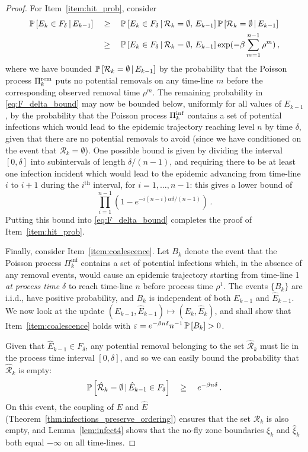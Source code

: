 \documentclass[]{article}
\newcommand{\Epidemic}{E}%
\newcommand{\Removals}{\mathcal{R}}
\newcommand{\Poisson}{\Pi}
\newcommand{\early}[1]{#1}
\newcommand{\late}[1]{\hat{#1}}
\newcommand{\PoissonRem}{\Poisson^\textup{rem}}
\newcommand{\PoissonInf}{\Poisson^\textup{inf}}
\begin{document}
\begin{proof}
For Item~\ref{item:hit_prob}, consider
\begin{align}
	\Prob{\Epidemic_k\in F_\delta\,|\, \Epidemic_{k-1}} \quad&\ge\quad \Prob{\Epidemic_k\in F_\delta\,|\, \Removals_k=\emptyset,\, \Epidemic_{k-1}}\Prob{\Removals_k=\emptyset\,|\, \Epidemic_{k-1}}  \nonumber \\
	&\ge\quad \Prob{\Epidemic_k\in F_\delta\,|\, \Removals_k=\emptyset,\, \Epidemic_{k-1}} \exp(-\beta\sum_{m=1}^{n-1} \rho^m) \,, \label{eq:F_delta_bound}
\end{align}
where we have bounded \(\Prob{\Removals_k=\emptyset\,|\, \Epidemic_{k-1}} \) by the probability that the Poisson process \(\PoissonRem_k\) puts no potential removals on any time-line \(m\) before the corresponding observed removal time \(\rho^m\). The remaining probability in \eqref{eq:F_delta_bound} may now be bounded below, uniformly for all values of \(\Epidemic_{k-1}\), by the probability that the Poisson process \(\PoissonInf_k\) contains a set of potential infections which would lead to the epidemic trajectory reaching level \(n\) by time \(\delta\), given that there are no potential removals to avoid (since we have conditioned on the event that \(\Removals_k=\emptyset\)). One possible bound is given by dividing the interval \([0,\delta]\) into subintervals of length \(\delta/(n-1)\), and requiring there to be at least one infection incident which would lead to the epidemic advancing from time-line \(i\) to \(i+1\) during the \(i^\text{th}\) interval, for \(i=1,\dots,n-1\): this gives a lower bound of 
	\[ 
		\prod_{i=1}^{n-1}(1- e^{-i(n-i)\alpha\delta/(n-1)})\,.
	\]
Putting this bound into \eqref{eq:F_delta_bound} completes the proof of Item~\ref{item:hit_prob}.

Finally, consider Item~\ref{item:coalescence}. Let \(B_k\) denote the event that the Poisson process \(\Pi_k^{\text{inf}}\) contains a set of potential infections which, in the absence of any removal events, would cause an epidemic trajectory starting from time-line 1 \textit{at process time \(\delta\)} to reach time-line \(n\) before process time \(\rho^1\). The events \(\{B_k\}\) are i.i.d., have positive probability, and \(B_k\) is independent of both \(\early{\Epidemic}_{k-1}\) and \(\late{\Epidemic}_{k-1}\). We now look at the update \((\early{\Epidemic}_{k-1}, \late{\Epidemic}_{k-1}) \mapsto (\early{\Epidemic}_{k}, \late{\Epidemic}_{k})\), and shall show that Item~\ref{item:coalescence} holds with \(\varepsilon = e^{-\beta n \delta}n^{-1}\operatorname{\mathbb{P}}\left[B_k\right]>0\).

Given that \(\late\Epidemic_{k-1}\in F_\delta\), any potential removal belonging to the set \(\late{\Removals}_k\) must lie in the process time interval \([0,\delta]\), and so we can easily bound the probability that \(\late{\Removals}_k\) is empty:
\[ 
 \Prob{\late\Removals_k = \emptyset \,|\, \late\Epidemic_{k-1}\in F_\delta} 
 \quad\ge\quad
 e^{-\beta n \delta} \,.
\]
On this event, the coupling of \(\early{\Epidemic}\) and \(\late{\Epidemic}\) (Theorem~\ref{thm:infections_preserve_ordering}) ensures that the set \(\early \Removals_k\) is also empty, and Lemma~\ref{lem:infect4} shows that the no-fly zone boundaries \(\early\xi_k\) and \(\late{\xi}_k\) both equal \(-\infty\) on all time-lines. 


\end{proof}
\end{document}
